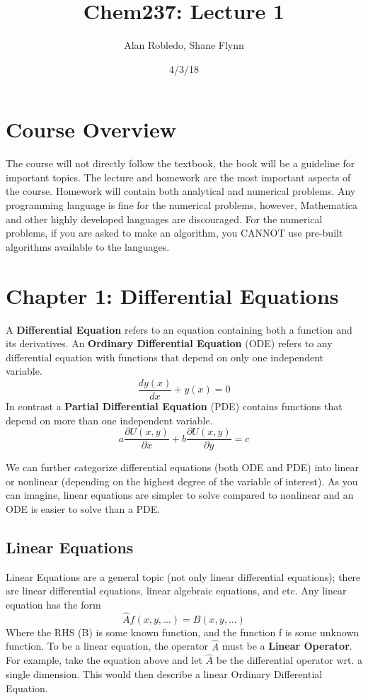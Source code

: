 \documentclass{article}
\title{Chem237: Lecture 1}
\date{4/3/18}
\author{Alan Robledo, Shane Flynn}
\newcommand{\be}{\begin{equation}}
\newcommand{\ee}{\end{equation}}
\newcommand{\pd}{\partial}
\begin{document}
\maketitle

\section*{Course Overview}
The course will not directly follow the textbook, the book will be a guideline for important topics.
The lecture and homework are the most important aspects of the course.
Homework will contain both analytical and numerical problems.
Any programming language is fine for the numerical problems, however, Mathematica and other highly developed languages are discouraged.
For the numerical problems, if you are asked to make an algorithm, you CANNOT use pre-built algorithms available to the languages.

\section*{Chapter 1: Differential Equations}
A \textbf{Differential Equation} refers to an equation containing both a function and its derivatives.
An \textbf{Ordinary Differential Equation} (ODE) refers to any differential equation with functions that depend on only one independent variable.
\be
\frac{dy(x)}{dx} + y(x) = 0
\ee
In contrast a \textbf{Partial Differential Equation} (PDE) contains functions that depend on more than one independent variable.
\be
a \frac{\pd U(x,y)}{\pd x} + b \frac{\pd U(x,y)}{\pd y} = c
\ee

We can further categorize differential equations (both ODE and PDE) into linear or nonlinear (depending on the highest degree of the variable of interest).
As you can imagine, linear equations are simpler to solve compared to nonlinear and an ODE is easier to solve than a PDE.

\subsection*{Linear Equations}
Linear Equations are a general topic (not only linear differential equations); there are linear differential equations, linear algebraic equations, and etc.
Any linear equation has the form
\be
\hat{A} f(x,y,\hdots) = B(x,y,\hdots)
\ee
Where the RHS (B) is some known function, and the function f is some unknown function.
To be a linear equation, the operator $\hat{A}$ must be a \textbf{Linear Operator}.
For example, take the equation above and let $\hat{A}$ be the differential operator wrt. a single dimension.
This would then describe a linear Ordinary Differential Equation.
\end{document}
